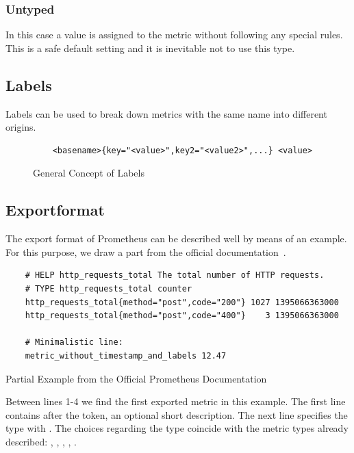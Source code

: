 \subsubsection{Untyped}
In this case a value is assigned to the metric without following any special rules. This is a safe default setting and it is inevitable not to use this type.
\subsection{Labels}
Labels can be used to break down metrics with the same name into different origins. 
\begin{figure}[!ht]
	\begin{verbatim}
	<basename>{key="<value>",key2="<value2>",...} <value>
	\end{verbatim}
	\caption{General Concept of Labels}
\end{figure}
\subsection{Exportformat}
\label{subsec:Exportformat}
The export format of Prometheus can be described well by means of an example. For this purpose, we draw a part from the official documentation~\cite{PrometheusExpositionFormatBeispiel}.\\
\par
\begin{listing}[H]
	\begin{verbatim}
	# HELP http_requests_total The total number of HTTP requests.
	# TYPE http_requests_total counter
	http_requests_total{method="post",code="200"} 1027 1395066363000
	http_requests_total{method="post",code="400"}    3 1395066363000
	
	# Minimalistic line:
	metric_without_timestamp_and_labels 12.47
	\end{verbatim}
	\caption{Partial Example from the Official Prometheus Documentation~\cite{PrometheusExpositionFormatBeispiel}}
\end{listing}
Between lines 1-4 we find the first exported metric in this example. The first line contains  after the token, an optional short description. The next line specifies the type with \linebreak {}. The choices regarding the type coincide with the metric types already described: , , , , .

